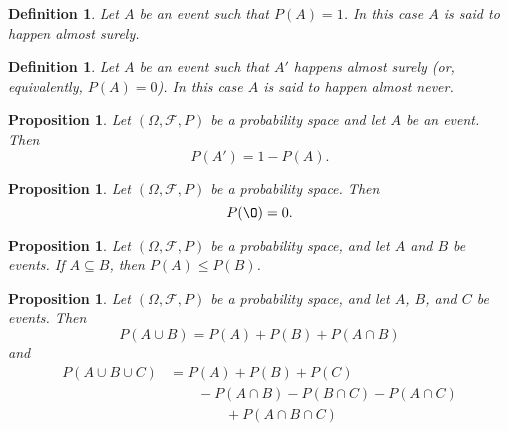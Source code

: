\documentclass[1pt]{report}
\newtheorem{prop}[thm]{Proposition}
\newtheorem{defn}[thm]{Definition}
\newcommand{\<}{\langle}
\renewcommand{\>}{\rangle}
\newcommand{\FF}{\mathcal{F}}
\begin{document}
\begin{defn} \label{def:almostsurely}
Let $A$ be an event such that $P(A) = 1$. In this case $A$ is said to happen \emph{almost surely}.
\end{defn}
\begin{defn} \label{def:almostnever}
Let $A$ be an event such that $A'$ happens almost surely (or, equivalently, $P(A) = 0$). In this case $A$ is said to happen \emph{almost never}.
\end{defn}
\begin{prop} \label{prop:probcomplement}
Let $(\Omega, \FF, P)$ be a probability space and let $A$ be an event. Then
$$P(A') = 1-P(A).$$
\end{prop}
\begin{prop} \label{prop:probempty}
Let $(\Omega, \FF, P)$ be a probability space. Then 
$$P(\O) = 0.$$
\end{prop}
\begin{prop} \label{prop:probsubset}
Let $(\Omega, \FF, P)$ be a probability space, and let $A$ and $B$ be events. If $A \subseteq B$, then $P(A) \leq P(B)$.
\end{prop}
\begin{prop} \label{prop:probunion}
Let $(\Omega, \FF, P)$ be a probability space, and let $A$, $B$, and $C$ be events. Then
$$P(A \cup B) = P(A) + P(B) + P(A\cap B)$$
and
\begin{align*}
P(A \cup B \cup C) &= P(A) + P(B) + P(C) \\ 
&\qquad  - P(A \cap B) - P(B\cap C) - P(A\cap C) \\ 
&\qquad \qquad + P(A\cap B \cap C)
\end{align*}
\end{prop}
\end{document}
